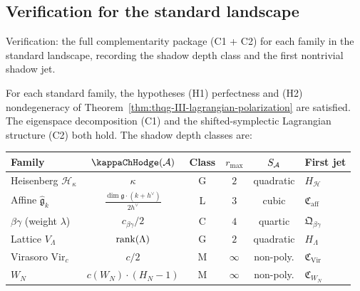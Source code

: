%
%

\subsection{Verification for the standard landscape}
\label{subsec:thqg-III-standard-landscape}

Verification: the full complementarity package (C1 + C2) for
each family in the standard landscape, recording the
shadow depth class and the first nontrivial shadow jet.

\begin{theorem}
For each standard family, the hypotheses
\textup{(H1)} perfectness and \textup{(H2)} nondegeneracy
of Theorem~\textup{\ref{thm:thqg-III-lagrangian-polarization}}
are satisfied. The eigenspace decomposition \textup{(C1)} and
the shifted-symplectic Lagrangian structure \textup{(C2)} both
hold. The shadow depth classes are:

\begin{center}
\renewcommand{\arraystretch}{1.3}
\begin{tabular}{l@{\;\;}c@{\;\;}c@{\;\;}c@{\;\;}c@{\;\;}l}
\textbf{Family} & $\kappaChHodge(\cA)$ & \textbf{Class}
& $r_{\max}$ & $S_{\mathcal{A}}$ & \textbf{First jet} \\
\midrule
Heisenberg $\mathcal{H}_\kappa$
& $\kappa$ & G & $2$ & quadratic & $H_{\mathcal{H}}$
\\
Affine $\widehat{\mathfrak{g}}_k$
& $\frac{\dim\mathfrak{g}\cdot(k+h^\vee)}{2h^\vee}$ & L & $3$ & cubic
& $\mathfrak{C}_{\mathrm{aff}}$
\\
$\beta\gamma$ (weight $\lambda$)
& $c_{\beta\gamma}/2$ & C & $4$ & quartic & $\mathfrak{Q}_{\beta\gamma}$
\\
Lattice $V_\Lambda$
& $\operatorname{rank}(\Lambda)$ & G & $2$ & quadratic & $H_\Lambda$
\\
Virasoro $\mathrm{Vir}_c$
& $c/2$ & M & $\infty$ & non-poly.
& $\mathfrak{C}_{\mathrm{Vir}}$
\\
$W_N$
& $c(W_N) \cdot (H_N - 1)$ & M & $\infty$ & non-poly.
& $\mathfrak{C}_{W_N}$
\\
\end{tabular}
\end{center}
\end{theorem}

